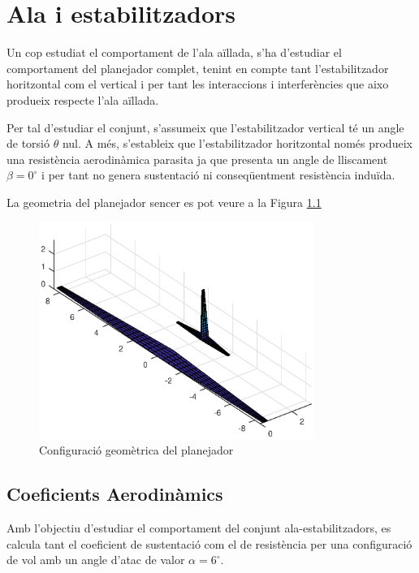 \chapter{Ala i estabilitzadors}

Un cop estudiat el comportament de l'ala aïllada, s'ha d'estudiar el comportament del planejador complet, tenint en compte tant l'estabilitzador horitzontal com el vertical i per tant les interaccions i interferències que aixo produeix respecte l'ala aïllada.

Per tal d'estudiar el conjunt, s'assumeix que l'estabilitzador vertical té un angle de torsió $\theta$ nul. A més, s'estableix que l'estabilitzador horitzontal només produeix una resistència aerodinàmica parasita ja que presenta un angle de lliscament $\beta=0^{\circ}$ i per tant no genera sustentació ni conseqüentment resistència induïda.

La geometria del planejador sencer es pot veure a la Figura \ref{glider}

 \begin{figure}[H]
 	\centering
 	\includegraphics[width=0.8\textwidth]{./plots/glider}
 	\caption{Configuració geomètrica del planejador}
 	\label{glider}
 \end{figure}

\section{Coeficients Aerodinàmics}

Amb l'objectiu d'estudiar el comportament del conjunt ala-estabilitzadors, es calcula tant el coeficient de sustentació com el de resistència per una configuració de vol amb un angle d'atac de valor $\alpha=6^{\circ}$. 

